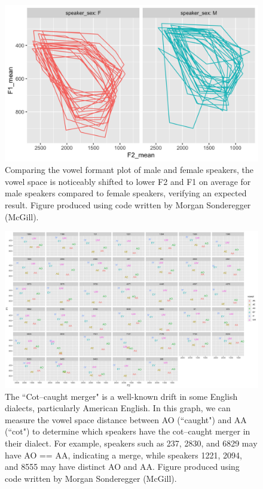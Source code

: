 \documentclass[11pt]{article}
\begin{document}
    \begin{figure}[h]
      \centering
      \includegraphics[scale=0.25]{sex_formant.png}
      \caption{Comparing the vowel formant plot of male and female speakers, the vowel space is noticeably shifted to lower F2 and F1 on average for male speakers compared to female speakers, verifying an expected result. Figure produced using code written by Morgan Sonderegger (McGill).}
      \label{fig:sex_formant}
    \end{figure}

    \begin{figure}[h]
      \centering
      \includegraphics[scale=0.15]{dialect-analysis.png}
      \caption{The ``Cot--caught merger" is a well-known drift in some English dialects, particularly American English. In this graph, we can measure the vowel space distance between AO (``caught") and AA (``cot") to determine which speakers have the cot--caught merger in their dialect. For example, speakers such as 237, 2830, and 6829 may have AO == AA, indicating a merge, while speakers 1221, 2094, and 8555 may have distinct AO and AA. Figure produced using code written by Morgan Sonderegger (McGill).}
      \label{fig:dialect-analysis}
    \end{figure}
\end{document}
